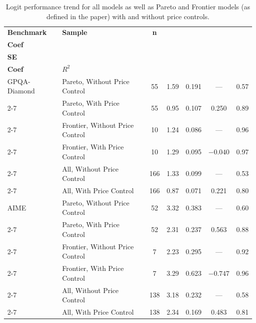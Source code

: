 \renewcommand{\arraystretch}{1.2}

\begin{table}[t]
\centering
\caption{Logit performance trend for all models as well as Pareto and Frontier models (as defined in the paper) with and without price controls.}
\label{tab:multi_benchmark_regression_rounded}
\renewcommand{\arraystretch}{1.2}

\begin{tabular}{|l|l|c|c|c|c|c|}
\hline
\textbf{Benchmark} &
\textbf{Sample} &
\textbf{n} &
\shortstack{\textbf{Time}\\\textbf{Coef}} &
\shortstack{\textbf{Time}\\\textbf{SE}} &
\shortstack{\textbf{Price}\\\textbf{Coef}} &
\textbf{$R^2$} \\
\hline

GPQA-Diamond & Pareto, Without Price Control & 55 & 1.59 & 0.191 & --- & 0.57 \\ \cline{2-7}
\rowcolor{restrgray} \cellcolor{white} & Pareto, With Price Control & 55 & 0.95 & 0.107 & 0.250 & 0.89 \\ \cline{2-7}
\cellcolor{white} & Frontier, Without Price Control & 10 & 1.24 & 0.086 & --- & 0.96 \\ \cline{2-7}
\rowcolor{restrgray} \cellcolor{white} & Frontier, With Price Control & 10 & 1.29 & 0.095 & $-0.040$ & 0.97 \\ \cline{2-7}
\cellcolor{white} & All, Without Price Control & 166 & 1.33 & 0.099 & --- & 0.53 \\ \cline{2-7}
\rowcolor{restrgray} \cellcolor{white} & All, With Price Control & 166 & 0.87 & 0.071 & 0.221 & 0.80 \\
\hline

AIME & Pareto, Without Price Control & 52 & 3.32 & 0.383 & --- & 0.60 \\ \cline{2-7}
\rowcolor{restrgray} \cellcolor{white} & Pareto, With Price Control & 52 & 2.31 & 0.237 & 0.563 & 0.88 \\ \cline{2-7}
\cellcolor{white} & Frontier, Without Price Control & 7 & 2.23 & 0.295 & --- & 0.92 \\ \cline{2-7}
\rowcolor{restrgray} \cellcolor{white} & Frontier, With Price Control & 7 & 3.29 & 0.623 & $-0.747$ & 0.96 \\ \cline{2-7}
\cellcolor{white} & All, Without Price Control & 138 & 3.18 & 0.232 & --- & 0.58 \\ \cline{2-7}
\rowcolor{restrgray} \cellcolor{white} & All, With Price Control & 138 & 2.34 & 0.169 & 0.483 & 0.81 \\
\hline


\end{tabular}
\end{table}
